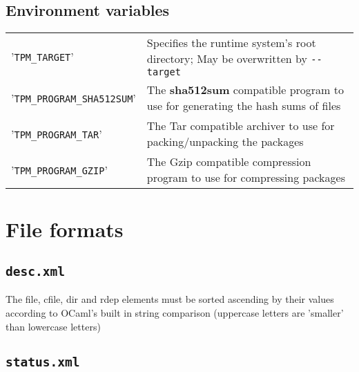 \documentclass[a4paper]{article}
\newcommand{\file}[1]{\texttt{#1}}
\newcommand{\program}[1]{\textbf{#1}}
\newcommand{\variable}[1]{'\texttt{#1}'}
\begin{document}
	\subsection{Environment variables}
	\label{sec:environment_variables}
	
	\bgroup
	\def\arraystretch{1.5}
	\begin{tabularx}{\textwidth}{lX}
		\variable{TPM\_TARGET} & Specifies the runtime system's root directory; May be overwritten by \texttt{-{}-target} \\
		
		\variable{TPM\_PROGRAM\_SHA512SUM} & The \program{sha512sum} compatible program to use for generating the hash sums of files \\

		\variable{TPM\_PROGRAM\_TAR} & The Tar compatible archiver to use for packing/unpacking the packages \\

		\variable{TPM\_PROGRAM\_GZIP} & The Gzip compatible compression program to use for compressing packages \\
	\end{tabularx}
	\egroup
	
	\section{File formats}
	\label{sec:file_formats}
	
	\subsection{\file{desc.xml}}
	\label{sec:desc.xml}
	

	\vspace{1em}
	The file, cfile, dir and rdep elements must be sorted ascending by their values according to OCaml's built in string comparison (uppercase letters are 'smaller' than lowercase letters)
	
	\subsection{\file{status.xml}}
	\label{sec:status.xml}
	
\end{document}
